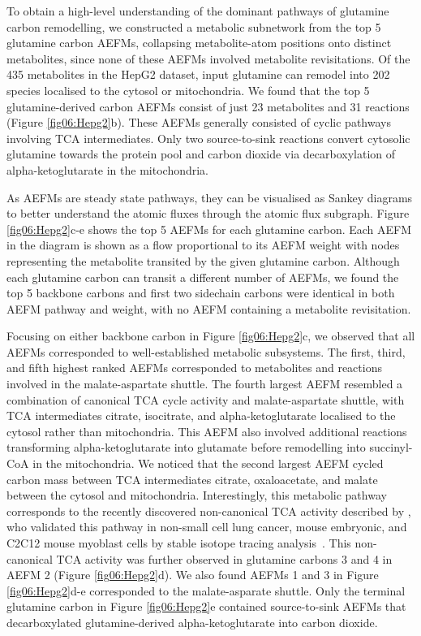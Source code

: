 \documentclass[12pt]{article}
\begin{document}
To obtain a high-level understanding of the dominant pathways of glutamine
carbon remodelling, we constructed a metabolic subnetwork from the top
5 glutamine carbon AEFMs, collapsing metabolite-atom positions onto
distinct metabolites, since none of these AEFMs involved metabolite
revisitations. Of the 435 metabolites in the HepG2 dataset, input
glutamine can remodel into 202 species localised to the cytosol or
mitochondria. We found that the top 5 glutamine-derived carbon AEFMs
consist of just 23 metabolites and 31 reactions (Figure
\ref{fig06:Hepg2}b). These AEFMs generally consisted of cyclic pathways
involving TCA intermediates. Only two source-to-sink reactions convert
cytosolic glutamine towards the protein pool and carbon dioxide via
decarboxylation of alpha-ketoglutarate in the mitochondria.

As AEFMs are steady state pathways, they can be visualised as Sankey
diagrams to better understand the atomic fluxes through the atomic flux
subgraph. Figure \ref{fig06:Hepg2}c-e shows the top 5 AEFMs for each
glutamine carbon. Each AEFM in the diagram is shown as a flow proportional
to its AEFM weight with nodes representing the metabolite transited by the
given glutamine carbon. Although each glutamine carbon can transit
a different number of AEFMs, we found the top 5 backbone carbons and first
two sidechain carbons were identical in both AEFM pathway and weight, with
no AEFM containing a metabolite revisitation.

Focusing on either backbone carbon in Figure \ref{fig06:Hepg2}c, we
observed that all AEFMs corresponded to well-established metabolic
subsystems. The first, third, and fifth highest ranked AEFMs corresponded
to metabolites and reactions involved in the malate-aspartate shuttle. The
fourth largest AEFM resembled a combination of canonical TCA cycle
activity and malate-aspartate shuttle, with TCA intermediates citrate,
isocitrate, and alpha-ketoglutarate localised to the cytosol rather than
mitochondria. This AEFM also involved additional reactions transforming
alpha-ketoglutarate into glutamate before remodelling into succinyl-CoA in
the mitochondria. We noticed that the second largest AEFM cycled carbon
mass between TCA intermediates citrate, oxaloacetate, and malate between
the cytosol and mitochondria. Interestingly, this metabolic pathway
corresponds to the recently discovered non-canonical TCA activity
described by \citeauthor{ArnoldPaigeK2022Anta}, who validated this pathway
in non-small cell lung cancer, mouse embryonic, and C2C12 mouse myoblast
cells by stable isotope tracing analysis~\citep{ArnoldPaigeK2022Anta}.
This non-canonical TCA activity was further observed in glutamine carbons
3 and 4 in AEFM 2 (Figure \ref{fig06:Hepg2}d). We also found AEFMs 1 and
3 in Figure \ref{fig06:Hepg2}d-e corresponded to the malate-asparate
  shuttle. Only the terminal glutamine carbon in Figure \ref{fig06:Hepg2}e
  contained source-to-sink AEFMs that decarboxylated glutamine-derived
  alpha-ketoglutarate into carbon dioxide.
\end{document}
